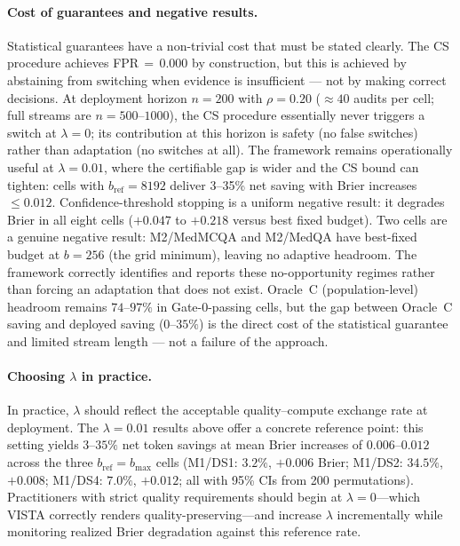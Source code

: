 \documentclass[a4paper,fleqn]{cas-sc}
\theoremstyle{plain}
\theoremstyle{definition}
\theoremstyle{remark}
\begin{document}
\paragraph{Cost of guarantees and negative results.}
Statistical guarantees have a non-trivial cost that must be stated clearly.
The CS procedure achieves FPR\,${=}\,0.000$ by construction, but this is achieved
by abstaining from switching when evidence is insufficient --- not by making correct
decisions.
At deployment horizon $n{=}200$ with $\rho{=}0.20$ (${\approx}40$ audits per cell;
full streams are $n{=}500$--$1000$), the CS procedure essentially never triggers
a switch at $\lambda{=}0$; its contribution at this horizon is safety (no false
switches) rather than adaptation (no switches at all).
The framework remains operationally useful at $\lambda{=}0.01$, where the
certifiable gap is wider and the CS bound can tighten: cells with $b_{\mathrm{ref}}{=}8192$
deliver 3--35\% net saving with Brier increases $\leq 0.012$.
Confidence-threshold stopping is a uniform negative result: it degrades Brier
in all eight cells ($+0.047$ to $+0.218$ versus best fixed budget).
Two cells are a genuine negative result: M2/MedMCQA and M2/MedQA have best-fixed
budget at $b{=}256$ (the grid minimum), leaving no adaptive headroom.
The framework correctly identifies and reports these no-opportunity regimes rather
than forcing an adaptation that does not exist.
Oracle~C (population-level) headroom remains $74$--$97\%$ in Gate-0-passing cells,
but the gap between Oracle~C saving and deployed saving ($0$--$35\%$) is the direct
cost of the statistical guarantee and limited stream length --- not a failure of the
approach.

\paragraph{Choosing $\lambda$ in practice.}
In practice, $\lambda$ should reflect the acceptable quality--compute exchange
rate at deployment.
The $\lambda{=}0.01$ results above offer a concrete reference point: this
setting yields $3$--$35\%$ net token savings at mean Brier increases of
$0.006$--$0.012$ across the three $b_{\mathrm{ref}}{=}b_{\max}$ cells
(M1/DS1: $3.2\%$, $+0.006$ Brier; M1/DS2: $34.5\%$, $+0.008$; M1/DS4:
$7.0\%$, $+0.012$; all with 95\% CIs from 200 permutations).
Practitioners with strict quality requirements should begin at $\lambda{=}0$---which
VISTA correctly renders quality-preserving---and increase $\lambda$
incrementally while monitoring realized Brier degradation against this
reference rate.
\end{document}

